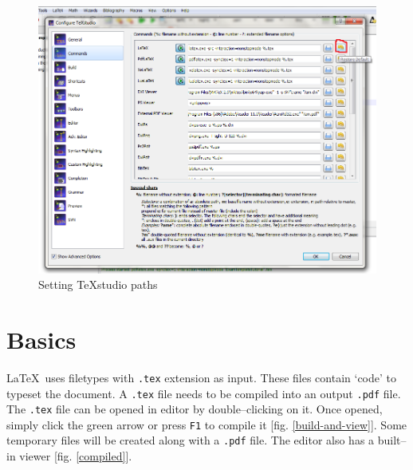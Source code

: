 \documentclass[12pt,a4paper]{article}
\begin{document}
\begin{figure}[H]
\centering
\includegraphics[scale=0.65]{TeXstudioPath.png}
\caption{Setting TeXstudio paths}
\label{texstudio-paths}
\end{figure}
\section{Basics}
\LaTeX~uses filetypes with \verb|.tex| extension as input. These files contain `code' to typeset the document. A \verb|.tex| file needs to be compiled into an output \verb|.pdf| file. The \verb|.tex| file can be opened in editor by double--clicking on it. Once opened, simply click the green arrow or press \verb|F1| to compile it [fig. \ref{build-and-view}]. Some temporary files will be created along with a \verb|.pdf| file. The editor also has a built--in viewer [fig. \ref{compiled}].
\end{document}
